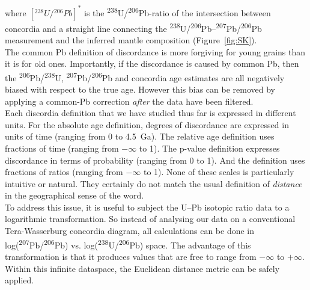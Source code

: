 \documentclass[gchron, manuscript]{copernicus}
\begin{document}
\noindent where $[{}^{238}U/{}^{206}Pb]^\ast$ is the
\textsuperscript{238}U/\textsuperscript{206}Pb-ratio of the
intersection between concordia and a straight line connecting the
\textsuperscript{238}U/\textsuperscript{206}Pb--\textsuperscript{207}Pb/\textsuperscript{206}Pb
measurement and the inferred mantle composition
(Figure~\ref{fig:SK}).\\

The common Pb definition of discordance is more forgiving for young
grains than it is for old ones. Importantly, if the discordance is
caused by common Pb, then the
\textsuperscript{206}Pb/\textsuperscript{238}U,
\textsuperscript{207}Pb/\textsuperscript{206}Pb and concordia age
estimates are all negatively biased with respect to the true
age. However this bias can be removed by applying a common-Pb
correction \emph{after} the data have been filtered.\\

Each discordia definition that we have studied thus far is expressed
in different units. For the absolute age definition, degrees of
discordance are expressed in units of time (ranging from 0 to
4.5~Ga). The relative age definition uses fractions of time (ranging
from $-\infty$ to 1). The p-value definition expresses discordance in
terms of probability (ranging from 0 to 1). And the \citet{stacey1975}
definition uses fractions of ratios (ranging from $-\infty$ to
1). None of these scales is particularly intuitive or natural. They
certainly do not match the usual definition of \emph{distance} in the
geographical sense of the word.\\

To address this issue, it is useful to subject the U--Pb isotopic
ratio data to a logarithmic transformation. So instead of analysing
our data on a conventional Tera-Wasserburg concordia diagram, all
calculations can be done in
log(\textsuperscript{207}Pb/\textsuperscript{206}Pb) vs.
log(\textsuperscript{238}U/\textsuperscript{206}Pb) space. The
advantage of this transformation is that it produces values that are
free to range from $-\infty$ to $+\infty$. Within this infinite
dataspace, the Euclidean distance metric can be safely applied.\\
\end{document}
